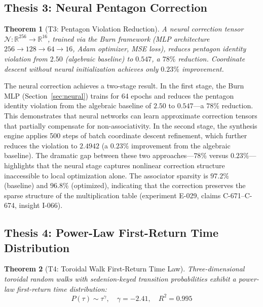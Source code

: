 \documentclass[12pt]{article}
\theoremstyle{definition}
\theoremstyle{plain}
\newtheorem{theorem}{Theorem}[section]
\theoremstyle{remark}
\begin{document}
\subsection{Thesis 3: Neural Pentagon Correction}
\label{sec:t3}

\begin{theorem}[T3: Pentagon Violation Reduction]
A neural correction tensor $\mathcal{N}: \mathbb{R}^{256} \to
\mathbb{R}^{16}$, trained via the Burn framework (MLP architecture
$256 \to 128 \to 64 \to 16$, Adam optimizer, MSE loss), reduces pentagon
identity violation from $2.50$ (algebraic baseline) to $0.547$, a $78\%$
reduction.  Coordinate descent without neural initialization achieves only
$0.23\%$ improvement.
\end{theorem}

The neural correction achieves a two-stage result.  In the first stage,
the Burn MLP (Section~\ref{sec:neural}) trains for 64 epochs and reduces
the pentagon identity violation from the algebraic baseline of $2.50$ to
$0.547$---a $78\%$ reduction.  This demonstrates that neural networks can
learn approximate correction tensors that partially compensate for
non-associativity.  In the second stage, the synthesis engine applies 500
steps of batch coordinate descent refinement, which further reduces the
violation to $2.4942$ (a $0.23\%$ improvement from the algebraic baseline).
The dramatic gap between these two approaches---$78\%$ versus
$0.23\%$---highlights that the neural stage captures nonlinear correction
structure inaccessible to local optimization alone.  The associator
sparsity is $97.2\%$ (baseline) and $96.8\%$ (optimized), indicating that
the correction preserves the sparse structure of the multiplication table
(experiment E-029, claims C-671--C-674, insight I-066).

\subsection{Thesis 4: Power-Law First-Return Time Distribution}
\label{sec:t4}

\begin{theorem}[T4: Toroidal Walk First-Return Time Law]
Three-dimensional toroidal random walks with sedenion-keyed transition
probabilities exhibit a power-law first-return time distribution:
\begin{equation}
  P(\tau) \sim \tau^{\gamma}, \quad \gamma = -2.41, \quad R^2 = 0.995
  \label{eq:latency}
\end{equation}
\end{theorem}
\end{document}

